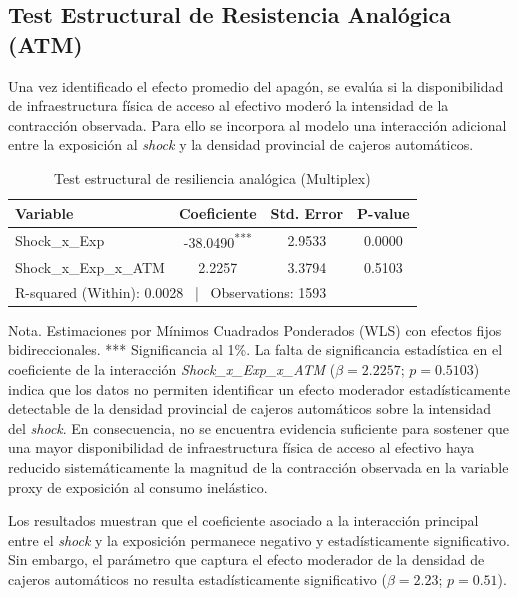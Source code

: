 \subsection{Test Estructural de Resistencia Anal\'ogica (ATM)}
\label{sec:5_2}

Una vez identificado el efecto promedio del apag\'on, se eval\'ua si la disponibilidad de infraestructura f\'isica de acceso al efectivo moder\'o la intensidad de la contracci\'on observada. Para ello se incorpora al modelo una interacci\'on adicional entre la exposici\'on al \textit{shock} y la densidad provincial de cajeros autom\'aticos.

\begin{table}[H]
\centering
\caption{Test estructural de resiliencia anal\'ogica (Multiplex)}
\label{tab:resiliencia_multiplex}
\begin{tabular}{lccc}
\hline\hline
Variable & Coeficiente & Std. Error & P-value \\ \hline
Shock\_x\_Exp         & -38.0490\textsuperscript{***} & 2.9533              & 0.0000           \\
Shock\_x\_Exp\_x\_ATM & 2.2257                        & 3.3794              & 0.5103           \\ \hline
\multicolumn{4}{l}{\small R-squared (Within): 0.0028 \ | \ Observations: 1593} \\
\hline\hline
\end{tabular}
\vspace{0.15cm}
\begin{flushleft}
\small{Nota. Estimaciones por M\'inimos Cuadrados Ponderados (WLS) con efectos fijos bidireccionales. *** Significancia al 1\%. La falta de significancia estad\'istica en el coeficiente de la interacci\'on \textit{Shock\_x\_Exp\_x\_ATM} ($\beta = 2.2257$; $p = 0.5103$) indica que los datos no permiten identificar un efecto moderador estad\'isticamente detectable de la densidad provincial de cajeros autom\'aticos sobre la intensidad del \textit{shock}. En consecuencia, no se encuentra evidencia suficiente para sostener que una mayor disponibilidad de infraestructura f\'isica de acceso al efectivo haya reducido sistem\'aticamente la magnitud de la contracci\'on observada en la variable proxy de exposici\'on al consumo inel\'astico.}
\end{flushleft}
\end{table}

Los resultados muestran que el coeficiente asociado a la interacci\'on principal entre el \textit{shock} y la exposici\'on permanece negativo y estad\'isticamente significativo. Sin embargo, el par\'ametro que captura el efecto moderador de la densidad de cajeros autom\'aticos no resulta estad\'isticamente significativo ($\beta = 2.23$; $p = 0.51$).

